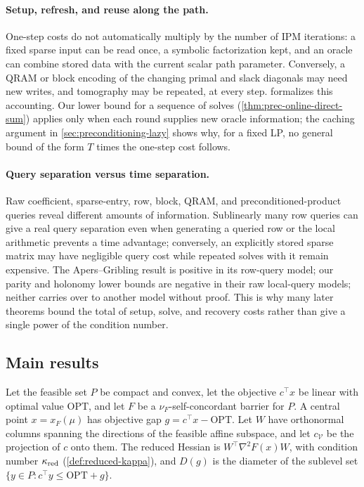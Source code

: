 \paragraph{Setup, refresh, and reuse along the path.}
One-step costs do not automatically multiply by the number of IPM
iterations: a fixed sparse input can be read once, a symbolic factorization
kept, and an oracle can combine stored data with the current scalar path
parameter.  Conversely, a QRAM or block encoding of
the changing primal and slack diagonals may need new writes, and tomography
may be repeated, at every step.   formalizes
this accounting.  Our lower bound for a sequence of solves
(\cref{thm:prec-online-direct-sum}) applies only when each round supplies new
oracle information; the caching argument in \cref{sec:preconditioning-lazy}
shows why, for a fixed LP, no general bound of the form \(T\) times the
one-step cost follows.

\paragraph{Query separation versus time separation.}
Raw coefficient, sparse-entry, row, block, QRAM, and preconditioned-product
queries reveal different amounts of information.  Sublinearly many row queries
can give a real query separation even when generating a queried row or the
local arithmetic prevents a time advantage; conversely, an explicitly stored
sparse matrix may have negligible query cost while repeated solves with it
remain expensive.  The Apers--Gribling result is positive in its row-query model;
our parity and holonomy lower bounds are negative in their raw local-query
models; neither carries over to another model without proof.  This is why
many later theorems bound the total of setup, solve, and recovery costs
rather than give a single power of the condition number.

\subsection{Main results}
\label{sec:introduction-answer}

Let the feasible set \(P\) be compact and convex, let the objective
\(c^\top x\) be linear with optimal value \(\mathrm{OPT}\), and let \(F\) be a
\(\nu_F\)-self-concordant barrier for \(P\).  A central point
\(x=x_F(\mu)\) has objective gap \(g=c^\top x-\mathrm{OPT}\).  Let \(W\) have
orthonormal columns spanning the directions of the feasible affine subspace,
and let \(c_{\mathcal V}\) be the projection of \(c\) onto them.  The reduced
Hessian is \(W^\top\nabla^2F(x)W\), with condition number \(\kappa_{\rm red}\)
(\cref{def:reduced-kappa}), and \(D(g)\) is the diameter of the sublevel set
\(\{y\in P:c^\top y\leq\mathrm{OPT}+g\}\).

